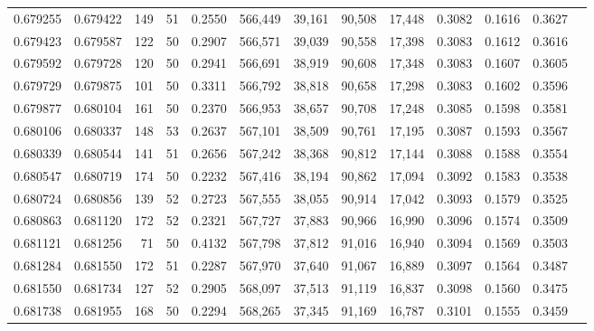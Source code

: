 \begin{tabular}{rrrrrrrrrrrrr}
0.679255 & 0.679422 &   149 &  51 &                                     0.2550 & 566,449 &  39,161 &  90,508 &  17,448 & 0.3082 & 0.1616 & 0.3627 \\
0.679423 & 0.679587 &   122 &  50 &                                     0.2907 & 566,571 &  39,039 &  90,558 &  17,398 & 0.3083 & 0.1612 & 0.3616 \\
0.679592 & 0.679728 &   120 &  50 &                                     0.2941 & 566,691 &  38,919 &  90,608 &  17,348 & 0.3083 & 0.1607 & 0.3605 \\
0.679729 & 0.679875 &   101 &  50 &                                     0.3311 & 566,792 &  38,818 &  90,658 &  17,298 & 0.3083 & 0.1602 & 0.3596 \\
0.679877 & 0.680104 &   161 &  50 &                                     0.2370 & 566,953 &  38,657 &  90,708 &  17,248 & 0.3085 & 0.1598 & 0.3581 \\
0.680106 & 0.680337 &   148 &  53 &                                     0.2637 & 567,101 &  38,509 &  90,761 &  17,195 & 0.3087 & 0.1593 & 0.3567 \\
0.680339 & 0.680544 &   141 &  51 &                                     0.2656 & 567,242 &  38,368 &  90,812 &  17,144 & 0.3088 & 0.1588 & 0.3554 \\
0.680547 & 0.680719 &   174 &  50 &                                     0.2232 & 567,416 &  38,194 &  90,862 &  17,094 & 0.3092 & 0.1583 & 0.3538 \\
0.680724 & 0.680856 &   139 &  52 &                                     0.2723 & 567,555 &  38,055 &  90,914 &  17,042 & 0.3093 & 0.1579 & 0.3525 \\
0.680863 & 0.681120 &   172 &  52 &                                     0.2321 & 567,727 &  37,883 &  90,966 &  16,990 & 0.3096 & 0.1574 & 0.3509 \\
0.681121 & 0.681256 &    71 &  50 &                                     0.4132 & 567,798 &  37,812 &  91,016 &  16,940 & 0.3094 & 0.1569 & 0.3503 \\
0.681284 & 0.681550 &   172 &  51 &                                     0.2287 & 567,970 &  37,640 &  91,067 &  16,889 & 0.3097 & 0.1564 & 0.3487 \\
0.681550 & 0.681734 &   127 &  52 &                                     0.2905 & 568,097 &  37,513 &  91,119 &  16,837 & 0.3098 & 0.1560 & 0.3475 \\
0.681738 & 0.681955 &   168 &  50 &                                     0.2294 & 568,265 &  37,345 &  91,169 &  16,787 & 0.3101 & 0.1555 & 0.3459 \\

\end{tabular}
